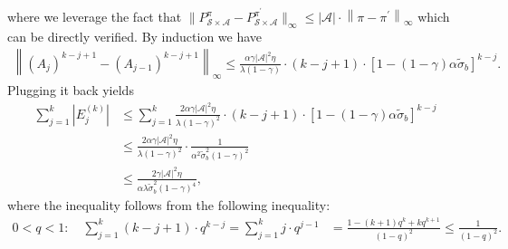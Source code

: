 \documentclass[10pt]{article}
\newcommand{\calA}{\mathcal{A}}
\newcommand{\calS}{\mathcal{S}}
\newcommand{\ls}{\left}
\newcommand{\rs}{\right}
\theoremstyle{plain}
\theoremstyle{definition}
\begin{document}
    where we leverage the fact that $\| P^{\pi}_{\scriptscriptstyle\calS\times\calA} - P^{\pi^\prime}_{\scriptscriptstyle\calS\times\calA} \|_\infty \leq |\calA| \cdot \ls\| \pi - \pi^\prime \rs\|_\infty$ which can be directly verified. By induction we have
    \begin{align*}
        \ls\| (A_{j})^{k-j+1} - (A_{j-1})^{k-j+1} \rs\|_\infty \leq \frac{\alpha\gamma |\calA|^2 \eta}{\lambda (1-\gamma)} \cdot (k-j+1) \cdot \ls[ 1-(1-\gamma)\alpha\tilde\sigma_b \rs]^{k-j}.
    \end{align*}
    Plugging it back yields
    \begin{align*}
        \sum_{j=1}^k \ls| E_j^{(k)} \rs| &\leq \sum_{j=1}^k \frac{2\alpha\gamma|\calA|^2 \eta}{\lambda (1-\gamma)^2} \cdot (k-j+1) \cdot \ls[ 1-(1-\gamma) \alpha \tilde\sigma_b \rs]^{k-j} \\
        &\leq \frac{2\alpha\gamma|\calA|^2 \eta}{\lambda (1-\gamma)^2} \cdot \frac{1}{\alpha^2\tilde\sigma_b^2 (1-\gamma)^2} \\
        &\leq \frac{2\gamma |\calA|^2 \eta}{\alpha\lambda\tilde\sigma_b^2 (1-\gamma)^4},
    \end{align*}
    where the inequality follows from the following inequality:
    \begin{align*}
        0 < q < 1: \quad \sum_{j=1}^k (k-j+1) \cdot q^{k-j} = \sum_{j=1}^k j \cdot q^{j-1} &= \frac{1-(k+1) q^k + kq^{k+1}}{(1-q)^2} \leq \frac{1}{(1-q)^2}.
    \end{align*}
\end{document}
